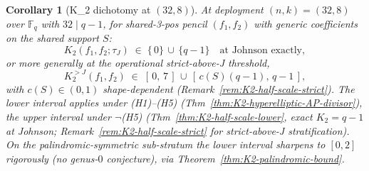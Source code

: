 \documentclass[11pt]{article}
\newtheorem{corollary}[theorem]{Corollary}
\theoremstyle{definition}
\theoremstyle{remark}
\newcommand{\FF}{\mathbb{F}}
\begin{document}
\begin{corollary}[K_2 dichotomy at $(32, 8)$]
At deployment $(n, k) = (32, 8)$ over $\FF_q$ with $32 \mid q - 1$, for
shared-3-pos pencil $(f_1, f_2)$ with generic coefficients on the
shared support $S$:
\[
 K_2(f_1, f_2; \tau_J) \;\in\; \{\,0\} \,\cup\, \{q - 1\}
 \quad \text{at Johnson exactly},
\]
or more generally at the operational strict-above-J threshold,
\[
 K_2^{>J}(f_1, f_2) \;\in\; [\,0, \,7\,] \,\cup\, [\,c(S)(q - 1), \,q - 1\,],
\]
with $c(S) \in (0, 1)$ shape-dependent
(Remark~\ref{rem:K2-half-scale-strict}).
The lower interval applies under (H1)–(H5)
(Thm~\ref{thm:K2-hyperelliptic-AP-divisor}), the upper interval under
$\neg$(H5) (Thm~\ref{thm:K2-half-scale-lower}, exact $K_2 = q - 1$ at
Johnson; Remark~\ref{rem:K2-half-scale-strict} for strict-above-J
stratification). On the
\emph{palindromic-symmetric} sub-stratum the lower interval sharpens
to $[0, 2]$ \emph{rigorously} (no genus-$0$ conjecture), via
Theorem~\ref{thm:K2-palindromic-bound}.
\end{corollary}
\end{document}
